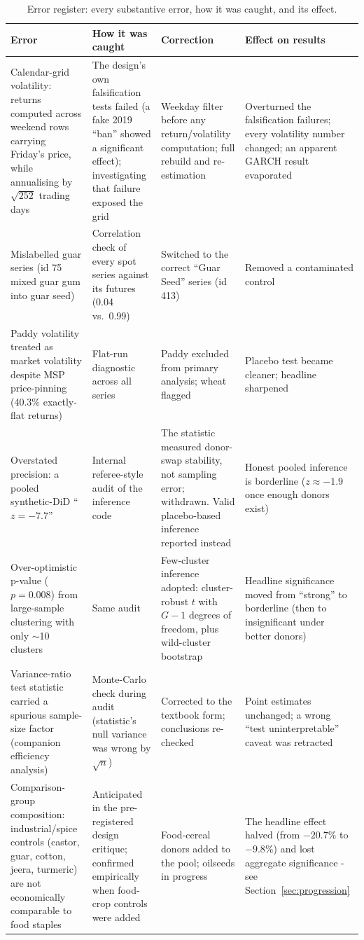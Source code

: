 \documentclass[11pt]{article}
\begin{document}
\begin{table}[htbp]
\centering\small
\caption{Error register: every substantive error, how it was caught, and its effect.}
\label{tab:errors}
\begin{tabular}{p{3.4cm} p{3.1cm} p{3.4cm} p{4.2cm}}
\toprule
Error & How it was caught & Correction & Effect on results \\
\midrule
Calendar-grid volatility: returns computed across weekend rows carrying Friday's price, while annualising by $\sqrt{252}$ trading days & The design's own falsification tests failed (a fake 2019 ``ban'' showed a significant effect); investigating that failure exposed the grid & Weekday filter before any return/volatility computation; full rebuild and re-estimation & Overturned the falsification failures; every volatility number changed; an apparent GARCH result evaporated \\
\addlinespace
Mislabelled guar series (id 75 mixed guar gum into guar seed) & Correlation check of every spot series against its futures (0.04 vs.\ 0.99) & Switched to the correct ``Guar Seed'' series (id 413) & Removed a contaminated control \\
\addlinespace
Paddy volatility treated as market volatility despite MSP price-pinning (40.3\% exactly-flat returns) & Flat-run diagnostic across all series & Paddy excluded from primary analysis; wheat flagged & Placebo test became cleaner; headline sharpened \\
\addlinespace
Overstated precision: a pooled synthetic-DiD ``$z=-7.7$'' & Internal referee-style audit of the inference code & The statistic measured donor-swap stability, not sampling error; withdrawn. Valid placebo-based inference reported instead & Honest pooled inference is borderline ($z\approx-1.9$ once enough donors exist) \\
\addlinespace
Over-optimistic p-value ($p=0.008$) from large-sample clustering with only $\sim$10 clusters & Same audit & Few-cluster inference adopted: cluster-robust $t$ with $G-1$ degrees of freedom, plus wild-cluster bootstrap & Headline significance moved from ``strong'' to borderline (then to insignificant under better donors) \\
\addlinespace
Variance-ratio test statistic carried a spurious sample-size factor (companion efficiency analysis) & Monte-Carlo check during audit (statistic's null variance was wrong by $\sqrt{n}$) & Corrected to the textbook form; conclusions re-checked & Point estimates unchanged; a wrong ``test uninterpretable'' caveat was retracted \\
\addlinespace
Comparison-group composition: industrial/spice controls (castor, guar, cotton, jeera, turmeric) are not economically comparable to food staples & Anticipated in the pre-registered design critique; confirmed empirically when food-crop controls were added & Food-cereal donors added to the pool; oilseeds in progress & The headline effect halved (from $-20.7\%$ to $-9.8\%$) and lost aggregate significance - see Section~\ref{sec:progression} \\
\bottomrule
\end{tabular}
\end{table}
\end{document}
